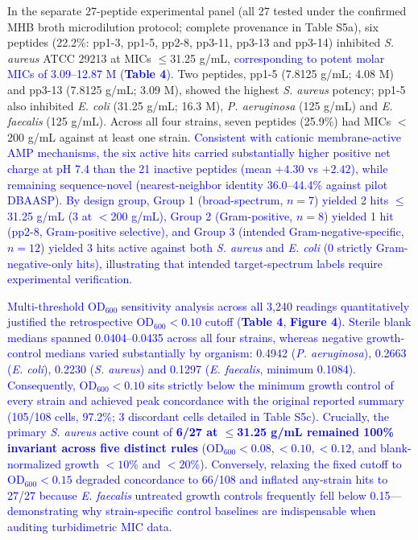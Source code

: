 \documentclass[unnumsec,webpdf,contemporary,large]{oup-authoring-template}
\newcommand{\rev}[1]{\textcolor{blue}{#1}}
\begin{document}
In the separate 27-peptide experimental panel (all 27 tested under the confirmed MHB broth microdilution protocol; complete provenance in Table S5a), six peptides (22.2\%: pp1-3, pp1-5, pp2-8, pp3-11, pp3-13 and pp3-14) inhibited \textit{S. aureus} ATCC 29213 at MICs $\leq$31.25 \textmu{}g/mL, \rev{corresponding to potent molar MICs of 3.09--12.87 \textmu{}M (\textbf{Table 4}).} Two peptides, pp1-5 (7.8125 \textmu{}g/mL; 4.08 \textmu{}M) and pp3-13 (7.8125 \textmu{}g/mL; 3.09 \textmu{}M), showed the highest \textit{S. aureus} potency; pp1-5 also inhibited \textit{E. coli} (31.25 \textmu{}g/mL; 16.3 \textmu{}M), \textit{P. aeruginosa} (125 \textmu{}g/mL) and \textit{E. faecalis} (125 \textmu{}g/mL). Across all four strains, seven peptides (25.9\%) had MICs $<$200 \textmu{}g/mL against at least one strain. \rev{Consistent with cationic membrane-active AMP mechanisms, the six active hits carried substantially higher positive net charge at pH 7.4 than the 21 inactive peptides (mean $+4.30$ vs $+2.42$), while remaining sequence-novel (nearest-neighbor identity 36.0--44.4\% against pilot DBAASP). By design group, Group 1 (broad-spectrum, $n=7$) yielded 2 hits $\leq$31.25 \textmu{}g/mL (3 at $<$200 \textmu{}g/mL), Group 2 (Gram-positive, $n=8$) yielded 1 hit (pp2-8, Gram-positive selective), and Group 3 (intended Gram-negative-specific, $n=12$) yielded 3 hits active against both \textit{S. aureus} and \textit{E. coli} (0 strictly Gram-negative-only hits), illustrating that intended target-spectrum labels require experimental verification.}

\rev{Multi-threshold OD$_{600}$ sensitivity analysis across all 3,240 readings quantitatively justified the retrospective OD$_{600}<0.10$ cutoff (\textbf{Table 4}, \textbf{Figure 4}). Sterile blank medians spanned 0.0404--0.0435 across all four strains, whereas negative growth-control medians varied substantially by organism: 0.4942 (\textit{P. aeruginosa}), 0.2663 (\textit{E. coli}), 0.2230 (\textit{S. aureus}) and 0.1297 (\textit{E. faecalis}, minimum 0.1084). Consequently, OD$_{600}<0.10$ sits strictly below the minimum growth control of every strain and achieved peak concordance with the original reported summary (105/108 cells, 97.2\%; 3 discordant cells detailed in Table S5c). Crucially, the primary \textit{S. aureus} active count of \textbf{6/27 at $\leq$31.25 \textmu{}g/mL remained 100\% invariant across five distinct rules} (OD$_{600}<0.08, <0.10, <0.12$, and blank-normalized growth $<10\%$ and $<20\%$). Conversely, relaxing the fixed cutoff to OD$_{600}<0.15$ degraded concordance to 66/108 and inflated any-strain hits to 27/27 because \textit{E. faecalis} untreated growth controls frequently fell below 0.15---demonstrating why strain-specific control baselines are indispensable when auditing turbidimetric MIC data.}
\end{document}
